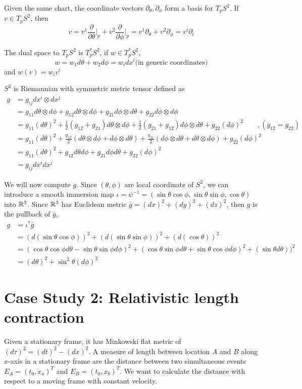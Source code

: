 \documentclass[12pt]{article}
\begin{document}
Given the same chart, the coordinate vectors $\partial_\theta, \partial_\phi$ form a basis for $T_pS^2$. If $v \in T_pS^2$, then  $$v = v^1 \frac{\partial}{\partial \theta}\bigg\rvert_p + v^2 \frac{\partial}{\partial \phi}\bigg\rvert_p = v^1\partial_\theta + v^2 \partial_\phi = v^i \partial_i $$

The dual space to $T_pS^2$ is $T^*_pS^2$, if $w \in T^*_pS^2$, $$w = w_1 d\theta + w_2 d\phi = w_i dx^i \text{(in generic coordinates)}$$
and $w(v) = w_i v^i$

$S^2$ is Riemannian with symmetric metric tensor defined as 
$$
\begin{aligned}
	g &= g_{ij}dx^i \otimes dx^j  \\
	  &= g_{11}d\theta\otimes d\phi + g_{12}d\theta \otimes d\phi + g_{21}d\phi \otimes d\theta + g_{22} d\phi \otimes d\phi \\
	  &= g_{11}(d\theta)^2 + \frac{1}{2}(g_{12} + g_{21}) d\theta \otimes d\phi +  \frac{1}{2}(g_{21} + g_{12})  d\phi\otimes d\theta +  g_{22} (d\phi)^2 \qquad ,(g_{12} = g_{22}) \\
	  &= g_{11}(d\theta)^2 + \frac{g_{12}}{2}(d\theta \otimes d\phi + d\phi\otimes d\theta) + \frac{g_{21}}{2}(d\phi\otimes d\theta + d\theta \otimes d\phi) + g_{22} (d\phi)^2 \\
	  &= g_{11}(d\theta)^2 + g_{12}d\theta d\phi + g_{21}d\phi d\theta + g_{22} (d\phi)^2 \\
	  &= g_{ij}dx^i dx^j
\end{aligned}$$

We will now compute $g$. Since $(\theta, \phi)$ are local coordinate of $S^2$, we can introduce a smooth immersion map $\iota = \psi^{-1} = (\sin\theta \cos\phi, \sin\theta\sin\phi, \cos\theta)$ into $\mathbb{R}^3$. Since $\mathbb{R}^3$ has Euclidean metric $\bar{g} = (dx)^2 + (dy)^2 + (dz)^2$, then $g$ is the pullback of $\bar{g}$,
$$\begin{aligned} 
	g &= \iota^*\bar{g} \\
	  &= (d(\sin\theta \cos\phi))^2 + (d(\sin\theta\sin\phi))^2 + (d(\cos\theta))^2\\
	  &= (\cos\theta \cos\phi d\theta - \sin\theta \sin\phi d\phi)^2 + (\cos\theta\sin\phi d\theta + \sin\theta\cos\phi d\phi)^2 + (\sin\theta d\theta))^2\\
	  &= (d\theta)^2 + \sin^2\theta (d\phi)^2
\end{aligned} 
$$


\section*{Case Study 2: Relativistic length contraction}
Given a stationary frame, it has Minkowski flat metric of $(d\tau)^2 = (dt)^2 - (dx)^2$.
A measure of length between location $A$ and $B$ along $x$-axis in a stationary frame are the distance between two simultaneous events $E_A = (t_0, x_a)^T$ and $E_B = (t_0, x_b)^T$. We want to calculate the distance with respect to a moving frame with constant velocity.
\end{document}
